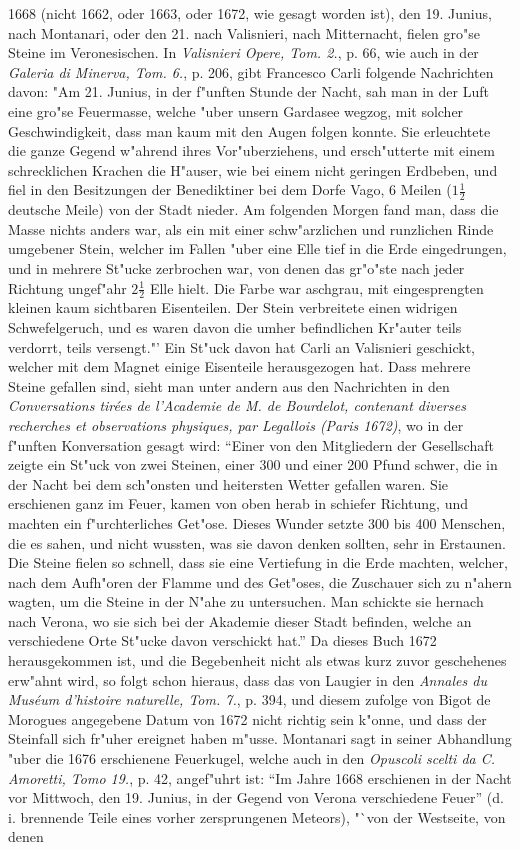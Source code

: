 \documentclass[a4paper, 11pt, oneside, polutonikogreek, german]{article}
\begin{document}
1668 (nicht 1662, oder 1663, oder 1672, wie gesagt worden ist), den 19. Junius, nach Montanari, oder den 21. nach Valisnieri, nach Mitternacht, fielen gro"se Steine im Veronesischen. In \emph{Valisnieri Opere, Tom. 2.}, p. 66, wie auch in der \emph{Galeria di Minerva, Tom. 6.}, p. 206, gibt Francesco Carli folgende Nachrichten davon: "Am 21. Junius, in der f"unften Stunde der Nacht, sah man in der Luft eine gro"se Feuermasse, welche "uber unsern Gardasee wegzog, mit solcher Geschwindigkeit, dass man kaum mit den Augen folgen konnte. Sie erleuchtete die ganze Gegend w"ahrend ihres Vor"uberziehens, und ersch"utterte mit einem schrecklichen Krachen die H"auser, wie bei einem nicht geringen Erdbeben, und fiel in den Besitzungen der Benediktiner bei dem Dorfe Vago, 6 Meilen ($\mathfrak{1\frac{1}{2}}$ deutsche Meile) von der Stadt nieder. Am folgenden Morgen fand man, dass die Masse nichts anders war, als ein mit einer schw"arzlichen und runzlichen Rinde umgebener Stein, welcher im Fallen "uber eine Elle tief in die Erde eingedrungen, und in mehrere St"ucke zerbrochen war, von denen das gr"o"ste nach jeder Richtung ungef"ahr $\mathfrak{2\frac{1}{2}}$ Elle hielt. Die Farbe war aschgrau, mit eingesprengten kleinen kaum sichtbaren Eisenteilen. Der Stein verbreitete einen widrigen Schwefelgeruch, und es waren davon die umher befindlichen Kr"auter teils verdorrt, teils versengt."' Ein St"uck davon hat Carli an Valisnieri geschickt, welcher mit dem Magnet einige Eisenteile herausgezogen hat. Dass mehrere Steine gefallen sind, sieht man unter andern aus den Nachrichten in den \emph{Conversations tirées de l'Academie de M. de Bourdelot, contenant diverses recherches et observations physiques, par Legallois (Paris 1672)}, wo in der f"unften Konversation gesagt wird: "`Einer von den Mitgliedern der Gesellschaft zeigte ein St"uck von zwei Steinen, einer 300 und einer 200 Pfund schwer, die in der Nacht bei dem sch"onsten und heitersten Wetter gefallen waren. Sie erschienen ganz im Feuer, kamen von oben herab in schiefer Richtung, und machten ein f"urchterliches Get"ose. Dieses Wunder setzte 300 bis 400 Menschen, die es sahen, und nicht wussten, was sie davon denken sollten, sehr in Erstaunen. Die Steine fielen so schnell, dass sie eine Vertiefung in die Erde machten, welcher, nach dem Aufh"oren der Flamme und des Get"oses, die Zuschauer sich zu n"ahern wagten, um die Steine in der N"ahe zu untersuchen. Man schickte sie hernach nach Verona, wo sie sich bei der Akademie dieser Stadt befinden, welche an verschiedene Orte St"ucke davon verschickt hat."' Da dieses Buch 1672 herausgekommen ist, und die Begebenheit nicht als etwas kurz zuvor geschehenes erw"ahnt wird, so folgt schon hieraus, dass das von Laugier in den \emph{Annales du Muséum d'histoire naturelle, Tom. 7.}, p. 394, und diesem zufolge von Bigot de Morogues angegebene Datum von 1672 nicht richtig sein k"onne, und dass der Steinfall sich fr"uher ereignet haben m"usse. Montanari sagt in seiner Abhandlung "uber die 1676 erschienene Feuerkugel, welche auch in den \emph{Opuscoli scelti da C. Amoretti, Tomo 19.}, p. 42, angef"uhrt ist: "`Im Jahre 1668 erschienen in der Nacht vor Mittwoch, den 19. Junius, in der Gegend von Verona verschiedene Feuer"' (d. i. brennende Teile eines vorher zersprungenen Meteors), "`von der Westseite, von denen 
\end{document}
